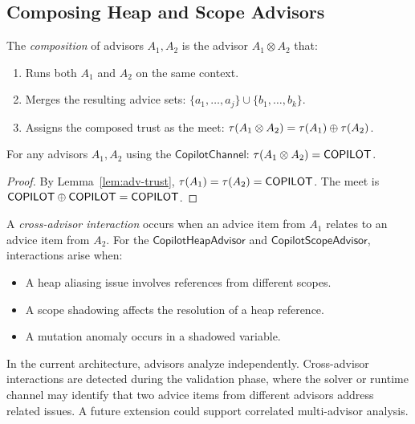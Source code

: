 \documentclass[11pt]{article}
\newcommand{\HeapAdv}{\mathsf{CopilotHeapAdvisor}}
\newcommand{\ScopeAdv}{\mathsf{CopilotScopeAdvisor}}
\newcommand{\CopChan}{\mathsf{CopilotChannel}}
\begin{document}
\subsection{Composing Heap and Scope Advisors}
\label{sec:composition:combine}

\begin{definition}
\label{def:adv-compose}
The \emph{composition} of advisors $A_1, A_2$ is the advisor
$A_1 \otimes A_2$ that:
\begin{enumerate}
\item Runs both $A_1$ and $A_2$ on the same context.
\item Merges the resulting advice sets: $\{a_1, \ldots, a_j\}
  \cup \{b_1, \ldots, b_k\}$.
\item Assigns the composed trust as the meet:
  $\tau(A_1 \otimes A_2) = \tau(A_1) \oplus \tau(A_2)$.
\end{enumerate}
\end{definition}

\begin{lemma}
\label{lem:comp-trust}
For any advisors $A_1, A_2$ using the $\CopChan$:
$\tau(A_1 \otimes A_2) = \mathsf{COPILOT}$.
\end{lemma}

\begin{proof}
By Lemma~\ref{lem:adv-trust}, $\tau(A_1) = \tau(A_2) = \mathsf{COPILOT}$.
The meet is $\mathsf{COPILOT} \oplus \mathsf{COPILOT} = \mathsf{COPILOT}$.
\end{proof}

\begin{definition}
\label{def:cross-advisor}
A \emph{cross-advisor interaction} occurs when an advice item
from $A_1$ relates to an advice item from $A_2$.  For the
$\HeapAdv$ and $\ScopeAdv$, interactions arise when:
\begin{itemize}[leftmargin=2em]
\item A heap aliasing issue involves references from different scopes.
\item A scope shadowing affects the resolution of a heap reference.
\item A mutation anomaly occurs in a shadowed variable.
\end{itemize}
\end{definition}

\begin{remark}
\label{rem:independent}
In the current architecture, advisors analyze independently.
Cross-advisor interactions are detected during the validation
phase, where the solver or runtime channel may identify that
two advice items from different advisors address related issues.
A future extension could support correlated multi-advisor analysis.
\end{remark}
\end{document}
